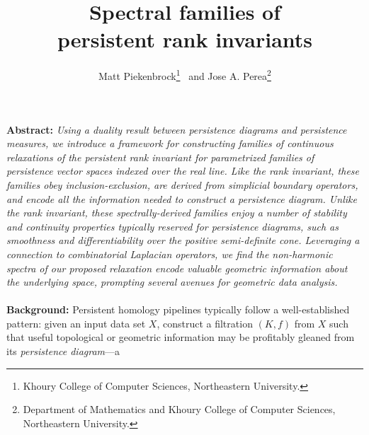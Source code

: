 \documentclass[10pt twocolumn]{article}
\title{\vspace{-2.0em} 
Spectral families of \\ persistent rank invariants
\vspace{-0.5em}}
\author{Matt Piekenbrock\thanks{Khoury College of Computer Sciences, Northeastern University.} \, and Jose A. Perea\thanks{Department of Mathematics and Khoury College of Computer Sciences, Northeastern University.}}
\date{}
\numberwithin{equation}{section}
\newcommand{\+}{%
	\raisebox{0.18ex}{\scaleobj{0.55}{+}}
}
\theoremstyle{definition}
\theoremstyle{definition}
\begin{document}
\begin{multicols}{2}
\maketitle
\noindent
\textbf{Abstract:} \emph{Using a duality result between persistence diagrams and persistence measures, we introduce a framework for constructing families of continuous relaxations of the persistent rank invariant for parametrized families of persistence vector spaces indexed over the real line. Like the rank invariant, these families obey inclusion-exclusion, are derived from simplicial boundary operators, and encode all the information needed to construct a persistence diagram. 
Unlike the rank invariant, these spectrally-derived families enjoy a number of stability and continuity properties typically reserved for persistence diagrams, such as smoothness and differentiability over the positive semi-definite cone. 
Leveraging a connection to combinatorial Laplacian operators, we find the non-harmonic spectra of our proposed relaxation encode valuable geometric information about the underlying space, prompting several avenues for geometric data analysis.
}
\\
\\
\noindent \textbf{Background:} Persistent homology pipelines typically follow a well-established pattern: given an input data set $X$, construct a filtration $(K, f)$ from $X$ such that useful topological or geometric information may be profitably gleaned from its \emph{persistence diagram}---a 

\end{multicols}
\end{document}
